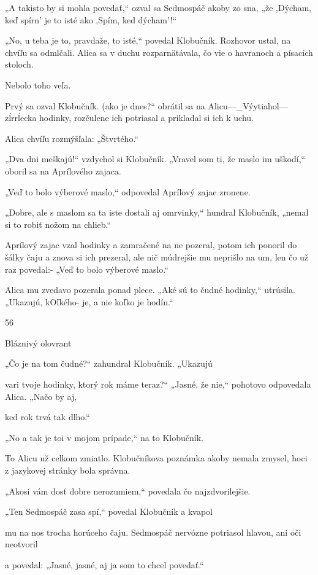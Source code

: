 \documentclass[12pt]{article}
\begin{document}
\begin{Parallel}[p]{}{}
{{„A takisto by si mohla povedať,“ ozval sa Sedmospáč
akoby zo sna, „že ,Dýcham, keď spírn' je to isté ako ,Spím,
ked dýcham'!“

„No, u teba je to, pravdaže, to isté,“ povedal Klobučník.
Rozhovor ustal, na chvíľu sa odmlčali. Alica sa v duchu
rozparnätávala, čo vie o havranoch a písacích stoloch.

Nebolo toho veľa.

Prvý sa ozval Klobučník. (ako je dnes?“ obrátil sa na
Alicu—_Výytiahol—zĺrrĺecka hodinky, rozčulene ich potriasal
a prikladal si ich k uchu.

Alica chvíľu rozmýšľala: „Štvrtého.“

„Dva dni meškajú!“ vzdychol si Klobučník. „Vravel
som ti, že maslo im uškodí,“ oboril sa na Aprílového
zajaca.

„Veď to bolo výberové maslo,“ odpovedal Aprílový zajac
zronene.

„Dobre, ale s maslom sa ta iste dostali aj omrvinky,“
hundral Klobučník, „nemal si to robiť nožom na chlieb.“

Aprílový zajac vzal hodinky a zamračené na ne pozeral,
potom ich ponoril do šálky čaju a znova si ich prezeral, ale
nič múdrejšie mu neprišlo na um, len čo už raz povedal:-
„Veď to bolo výberové maslo.“

Alica mu zvedavo pozerala ponad plece. „Aké sú to čudné
hodinky,“ utrúsila. „Ukazujú, kOľkého- je, a nie koľko je
hodín.“

56

Bláznivý olovrant

„Čo je na tom čudné?“ zahundral Klobučník. „Ukazujú

vari tvoje hodinky, ktorý rok máme teraz?“
„Jasné, že nie,“ pohotovo odpovedala Alica. „Načo by aj,

ked rok trvá tak dlho.“

„No a tak je toi v mojom prípade,“ na to Klobučník.

To Alicu už celkom zmiatlo. Klobučníkova poznámka
akoby nemala zmysel, hoci z jazykovej stránky bola
správna.

„Akosi vám dosť dobre nerozumiem,“ povedala čo
najzdvorilejšie.

„Ten Sedmospáč zasa spí,“ povedal Klobučník a kvapol

mu na nos trocha horúceho čaju.
Sedmospáč nervózne potriasol hlavou, ani oči neotvoril

 

a povedal:
„Jasné, jasné, aj ja som to chcel povedať.“

}}
\end{Parallel}
\end{document}
